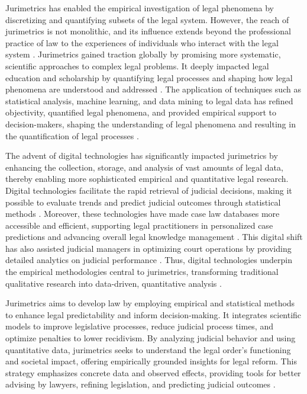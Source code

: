 Jurimetrics has enabled the empirical investigation of legal phenomena by discretizing and quantifying subsets of the legal system. However, the reach of jurimetrics is not monolithic, and its influence extends beyond the professional practice of law to the experiences of individuals who interact with the legal system \cite{10.1007/s11186-021-09453-1,unger2021process}. Jurimetrics gained traction globally by promising more systematic, scientific approaches to complex legal problems. It deeply impacted legal education and scholarship by quantifying legal processes and shaping how legal phenomena are understood and addressed \cite{loevinger1959}. The application of techniques such as statistical analysis, machine learning, and data mining to legal data has refined objectivity, quantified legal phenomena, and provided empirical support to decision-makers, shaping the understanding of legal phenomena and resulting in the quantification of legal processes \cite{aafedeccbdaceab,cadcdbdbbdad,faecffafcada,aeadeccffe,ccdacdfbcdaf}.

The advent of digital technologies has significantly impacted jurimetrics by enhancing the collection, storage, and analysis of vast amounts of legal data, thereby enabling more sophisticated empirical and quantitative legal research. Digital technologies facilitate the rapid retrieval of judicial decisions, making it possible to evaluate trends and predict judicial outcomes through statistical methods \cite{colombo2017, colombo2017, de2010, luvizotto2020, nunes2018, nunes2018, colombo2017, nunes2018, nunes2018, nunes2018, nunes2018, nunes2018, ribeiro2021, nunes2018, maia2019}. Moreover, these technologies have made case law databases more accessible and efficient, supporting legal practitioners in personalized case predictions and advancing overall legal knowledge management \cite{de2010}. This digital shift has also assisted judicial managers in optimizing court operations by providing detailed analytics on judicial performance \cite{luvizotto2020}. Thus, digital technologies underpin the empirical methodologies central to jurimetrics, transforming traditional qualitative research into data-driven, quantitative analysis \cite{nunes2018}.

Jurimetrics aims to develop law by employing empirical and statistical methods to enhance legal predictability and inform decision-making. It integrates scientific models to improve legislative processes, reduce judicial process times, and optimize penalties to lower recidivism. By analyzing judicial behavior and using quantitative data, jurimetrics seeks to understand the legal order's functioning and societal impact, offering empirically grounded insights for legal reform. This strategy emphasizes concrete data and observed effects, providing tools for better advising by lawyers, refining legislation, and predicting judicial outcomes \cite{nunes2018, nunes2018, de2010, nunes2018, nunes2018}.

